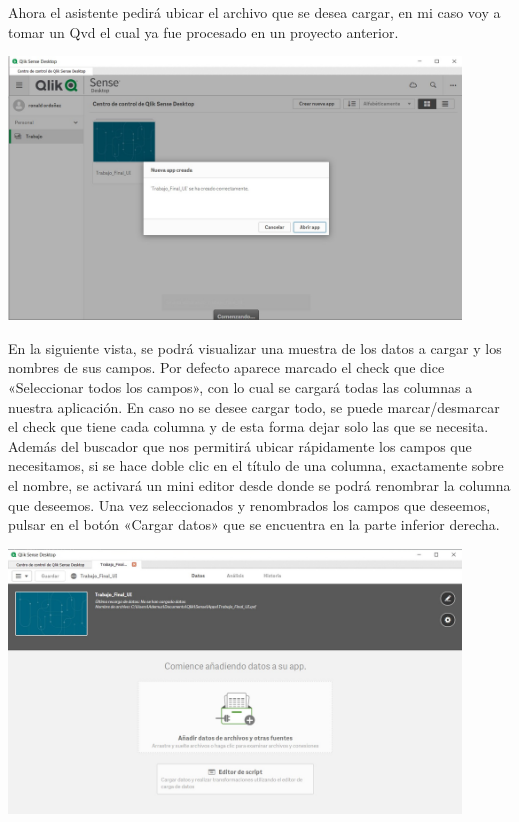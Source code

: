 Ahora el asistente pedirá ubicar el archivo que se desea cargar, en mi caso voy a tomar un Qvd el cual ya fue procesado en un proyecto anterior.
\begin{center}
	\includegraphics[width=12cm]{./Imagenes/img10} 
\end{center}

En la siguiente vista, se podrá visualizar una muestra de los datos a cargar y los nombres de sus campos.
Por defecto aparece marcado el check que dice «Seleccionar todos los campos», con lo cual se cargará todas las columnas a nuestra aplicación. En caso no se desee cargar todo, se puede marcar/desmarcar el check que tiene cada columna y de esta forma dejar solo las que se necesita.
Además del buscador que nos permitirá ubicar rápidamente los campos que necesitamos, si se hace doble clic en el título de una columna, exactamente sobre el nombre, se activará un mini editor desde donde se podrá renombrar la columna que deseemos.
Una vez seleccionados y renombrados los campos que deseemos, pulsar en el botón «Cargar datos» que se encuentra en la parte inferior derecha.

\begin{center}
	\includegraphics[width=12cm]{./Imagenes/img11} 
\end{center}

